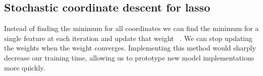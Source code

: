 \documentclass{article} %
\begin{document}
\subsection{Stochastic coordinate descent for lasso}
Instead of finding the minimum for all coordinates we can find the minimum for a single feature at each iteration and update that weight ~\cite{shalev2011stochastic}. We can stop updating the weights when the weight converges. Implementing this method would sharply decrease our training time, allowing us to prototype new model implementations more quickly.




\end{document}
